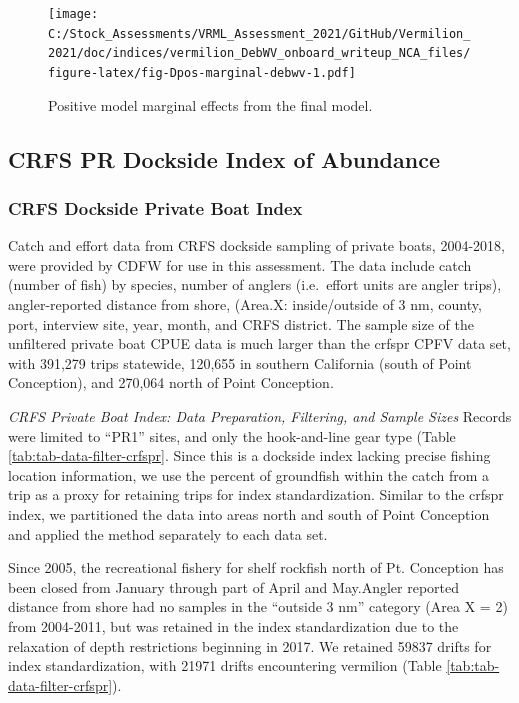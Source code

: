 \documentclass[
  english,
  a4paper,
]{article}
\begin{document}
\begin{figure}
\centering
\texttt{[image: C:/Stock\_Assessments/VRML\_Assessment\_2021/GitHub/Vermilion\_2021/doc/indices/vermilion\_DebWV\_onboard\_writeup\_NCA\_files/figure-latex/fig-Dpos-marginal-debwv-1.pdf]}
\caption{\label{fig:fig-Dpos-marginal-debwv}Positive model marginal effects from the final model.}
\end{figure}

\clearpage

\hypertarget{crfs-pr-dockside-index-of-abundance}{%
\subsection{CRFS PR Dockside Index of Abundance}\label{crfs-pr-dockside-index-of-abundance}}

\hypertarget{crfs-dockside-private-boat-index}{%
\subsubsection{CRFS Dockside Private Boat Index}\label{crfs-dockside-private-boat-index}}

Catch and effort data from CRFS dockside sampling of private boats, 2004-2018,
were provided by CDFW for use in this assessment. The data include catch (number
of fish) by species, number of anglers (i.e.~effort units are angler trips),
angler-reported distance from shore, (Area.X: inside/outside of 3 nm, county, port,
interview site, year, month, and CRFS district. The sample size of the
unfiltered private boat CPUE data is much larger than the crfspr CPFV data set,
with 391,279 trips statewide, 120,655 in southern California (south
of Point Conception), and 270,064 north of Point Conception.

\emph{CRFS Private Boat Index: Data Preparation, Filtering, and Sample Sizes}
Records were limited to ``PR1'' sites, and only the hook-and-line gear type
(Table \ref{tab:tab-data-filter-crfspr}.
Since this is a dockside index lacking precise fishing location information, we
use the percent of groundfish within the catch from a trip as a proxy for retaining
trips for index standardization. Similar to the crfspr index, we partitioned the
data into areas north and south of Point Conception and applied the method
separately to each data set.

Since 2005, the recreational fishery for shelf rockfish north of Pt. Conception
has been closed from January through part of April and May.Angler reported distance
from shore had no samples in the ``outside 3 nm'' category (Area X = 2)
from 2004-2011, but was retained in the index standardization due to the relaxation
of depth restrictions beginning in 2017. We retained 59837 drifts for index standardization, with 21971 drifts encountering vermilion
(Table \ref{tab:tab-data-filter-crfspr}).
\end{document}
